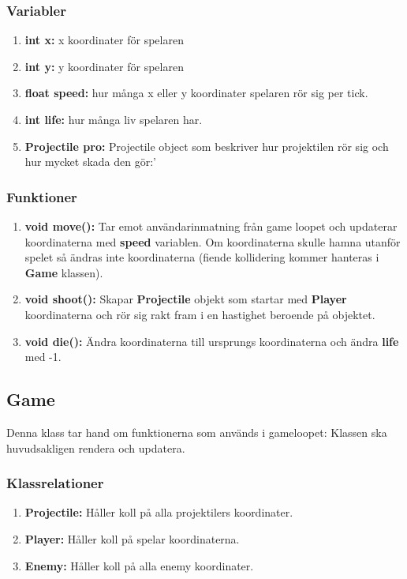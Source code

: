 \documentclass{TDP005mall}
\begin{document}
\subsubsection*{Variabler}
\begin{enumerate}
  \item \textbf{int x{}:} x koordinater för spelaren
  \item \textbf{int y{}:} y koordinater för spelaren
  \item \textbf{float speed{}:} hur många x eller y koordinater spelaren rör sig per tick.
  \item \textbf{int life{}:} hur många liv spelaren har.
  \item \textbf{Projectile pro{}:} Projectile object som beskriver hur projektilen rör sig och hur mycket skada den gör:'
\end{enumerate}
\subsubsection*{Funktioner}
\begin{enumerate}
  \item \textbf{void move():} Tar emot användarinmatning från game loopet och updaterar koordinaterna med \textbf{speed} variablen.
    Om koordinaterna skulle hamna utanför spelet så ändras inte koordinaterna (fiende kollidering kommer hanteras i \textbf{Game} klassen). 
  \item \textbf{void shoot():} Skapar \textbf{Projectile} objekt som startar med \textbf{Player} koordinaterna och rör sig rakt fram i en hastighet beroende på objektet. 
  \item \textbf{void die():} Ändra koordinaterna till ursprungs koordinaterna och ändra \textbf{life} med -1.
  
\end{enumerate}
\subsection{Game}
Denna klass tar hand om funktionerna som används i gameloopet:
Klassen ska huvudsakligen rendera och updatera.
\subsubsection*{Klassrelationer}
\begin{enumerate}
  \item \textbf{Projectile: } Håller koll på alla projektilers koordinater.
  \item \textbf{Player: } Håller koll på spelar koordinaterna.
  \item \textbf{Enemy: } Håller koll på alla enemy koordinater.
 \end{enumerate}
\end{document}
